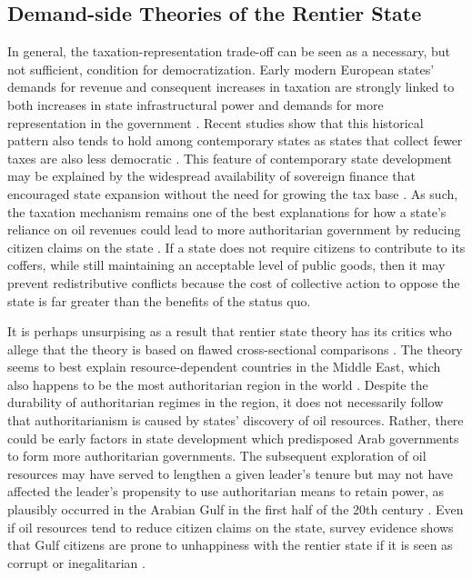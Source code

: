 \documentclass[12pt, letterpaper]{article}
\begin{document}
\subsection*{Demand-side Theories of the Rentier State}

In general, the taxation-representation trade-off can be seen as a necessary, but not sufficient, condition for democratization. Early modern European states' demands for revenue and consequent increases in taxation are strongly linked to both increases in state infrastructural power and demands for more representation in the government \parencite{weiss_states_1995, dincecco_fiscal_2009, levi_rule_1989, bates_note_1985}. Recent studies show that this historical pattern also tends to hold among contemporary states as states that collect fewer taxes are also less democratic \parencite{slater_economic_2014}. This feature of contemporary state development may be explained by the widespread availability of sovereign finance that encouraged state expansion without the need for growing the tax base \parencite{migdal_strong_1988,queralt_war_2019}. As such, the taxation mechanism remains one of the best explanations for how a state's reliance on oil revenues could lead to more authoritarian government by reducing citizen claims on the state \parencite{jones_bedouins_2017}. If a state does not require citizens to contribute to its coffers, while still maintaining an acceptable level of public goods, then it may prevent redistributive conflicts because the cost of collective action to oppose the state is far greater than the benefits of the status quo.

It is perhaps unsurpising as a result that rentier state theory has its critics who allege that the theory is based on flawed cross-sectional comparisons \parencite{waldner_against_2015,herb_no_2005}. The theory seems to best explain resource-dependent countries in the Middle East, which also happens to be the most authoritarian region in the world \parencite{jamal_democracy_2008}. Despite the durability of authoritarian regimes in the region, it does not necessarily follow that authoritarianism is caused by states' discovery of oil resources. Rather, there could be early factors in state development which predisposed Arab governments to form more authoritarian governments. The subsequent exploration of oil resources may have served to lengthen a given leader's tenure but may not have affected the leader's propensity to use authoritarian means to retain power, as plausibly occurred in the Arabian Gulf in the first half of the 20th century \parencite{waldner_survivorship_2021}. Even if oil resources tend to reduce citizen claims on the state, survey evidence shows that Gulf citizens are prone to unhappiness with the rentier state if it is seen as corrupt or inegalitarian \parencite{mitchell_what_2019}.
\end{document}
